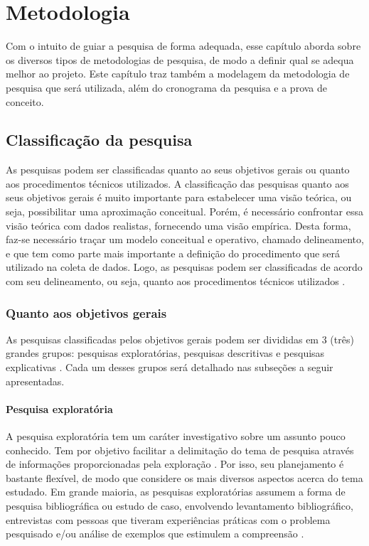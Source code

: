 \chapter{Metodologia}
Com o intuito de guiar a pesquisa de forma adequada, esse capítulo aborda sobre os diversos tipos de metodologias de pesquisa, de modo a definir qual se adequa melhor ao projeto. Este capítulo traz também a modelagem da metodologia de pesquisa que será utilizada, além do cronograma da pesquisa e a prova de conceito.

\section{Classificação da pesquisa}
	As pesquisas podem ser classificadas quanto ao seus objetivos gerais ou quanto aos procedimentos técnicos utilizados. A classificação das pesquisas quanto aos seus objetivos gerais é muito importante para estabelecer uma visão teórica, ou seja, possibilitar uma aproximação conceitual. Porém, é necessário confrontar essa visão teórica com dados realistas, fornecendo uma visão empírica. Desta forma, faz-se necessário traçar um modelo conceitual e operativo, chamado delineamento, e que tem como parte mais importante a definição do procedimento que será utilizado na coleta de dados. Logo, as pesquisas podem ser classificadas de acordo com seu delineamento, ou seja, quanto aos procedimentos técnicos utilizados \cite{ac2002elaborar}.

\subsection{Quanto aos objetivos gerais}
	As pesquisas classificadas pelos objetivos gerais podem ser divididas em 3 (três) grandes grupos: pesquisas exploratórias, pesquisas descritivas e pesquisas explicativas \cite{ac2002elaborar}. Cada um desses grupos será detalhado nas subseções a seguir apresentadas. 
\subsubsection{Pesquisa exploratória}
	A pesquisa exploratória tem um caráter investigativo sobre um assunto pouco conhecido. Tem por objetivo facilitar a delimitação do tema de pesquisa através de informações proporcionadas pela exploração \cite{prodanov2013metodologia}. Por isso, seu planejamento é bastante flexível, de modo que considere os mais diversos aspectos acerca do tema estudado. Em grande maioria, as pesquisas exploratórias assumem a forma de pesquisa bibliográfica ou estudo de caso, envolvendo levantamento bibliográfico, entrevistas com pessoas que tiveram experiências práticas com o problema pesquisado e/ou análise de exemplos que estimulem a compreensão \cite{ac2002elaborar}.
